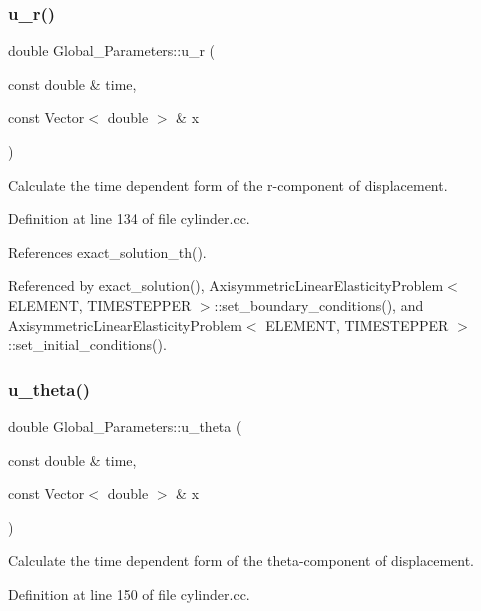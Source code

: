 \subsubsection{\texorpdfstring{u\+\_\+r()}{u\_r()}}
{\footnotesize\ttfamily double Global\+\_\+\+Parameters\+::u\+\_\+r (\begin{DoxyParamCaption}\item[{const double \&}]{time,  }\item[{const Vector$<$ double $>$ \&}]{x }\end{DoxyParamCaption})}



Calculate the time dependent form of the r-\/component of displacement. 



Definition at line 134 of file cylinder.\+cc.



References exact\+\_\+solution\+\_\+th().



Referenced by exact\+\_\+solution(), Axisymmetric\+Linear\+Elasticity\+Problem$<$ E\+L\+E\+M\+E\+N\+T, T\+I\+M\+E\+S\+T\+E\+P\+P\+E\+R $>$\+::set\+\_\+boundary\+\_\+conditions(), and Axisymmetric\+Linear\+Elasticity\+Problem$<$ E\+L\+E\+M\+E\+N\+T, T\+I\+M\+E\+S\+T\+E\+P\+P\+E\+R $>$\+::set\+\_\+initial\+\_\+conditions().

\mbox{\label{namespaceGlobal__Parameters_aed85254e9565e5e25dbe336a799bf6b5}} 
\subsubsection{\texorpdfstring{u\+\_\+theta()}{u\_theta()}}
{\footnotesize\ttfamily double Global\+\_\+\+Parameters\+::u\+\_\+theta (\begin{DoxyParamCaption}\item[{const double \&}]{time,  }\item[{const Vector$<$ double $>$ \&}]{x }\end{DoxyParamCaption})}



Calculate the time dependent form of the theta-\/component of displacement. 



Definition at line 150 of file cylinder.\+cc.



